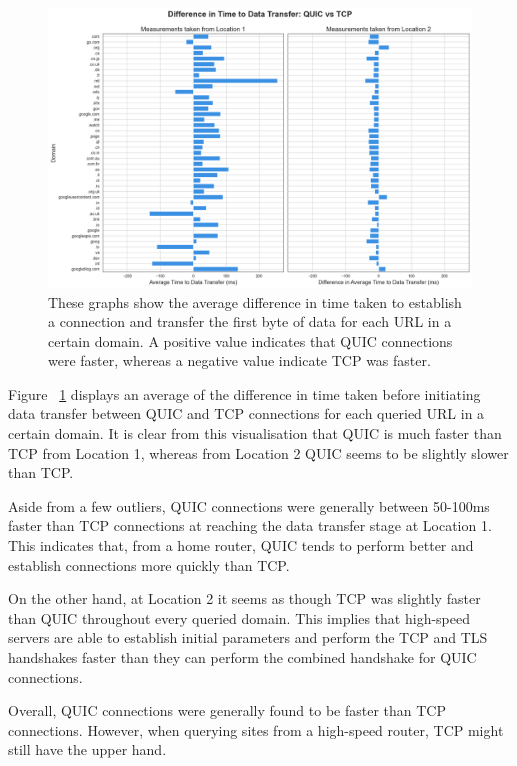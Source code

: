 \documentclass{l4proj}
\begin{document}
\begin{figure}
    \centering
    \includegraphics[width=1\linewidth]{images/domainDifference_QUICvsTCP.png}
    \caption{These graphs show the average difference in time taken to establish a connection and transfer the first byte of data for each URL in a certain domain. A positive value indicates that QUIC connections were faster, whereas a negative value indicate TCP was faster.}
    \label{fig:domainDifference}
\end{figure}

Figure ~\ref{fig:domainDifference} displays an average of the difference in time taken before initiating data transfer between QUIC and TCP connections for each queried URL in a certain domain. It is clear from this visualisation that QUIC is much faster than TCP from Location 1, whereas from Location 2 QUIC seems to be slightly slower than TCP. 

Aside from a few outliers, QUIC connections were generally between 50-100ms faster than TCP connections at reaching the data transfer stage at Location 1. This indicates that, from a home router, QUIC tends to perform better and establish connections more quickly than TCP.

On the other hand, at Location 2 it seems as though TCP was slightly faster than QUIC throughout every queried domain. This implies that high-speed servers are able to establish initial parameters and perform the TCP and TLS handshakes faster than they can perform the combined handshake for QUIC connections.

Overall, QUIC connections were generally found to be faster than TCP connections. However, when querying sites from a high-speed router, TCP might still have the upper hand.
\end{document}
